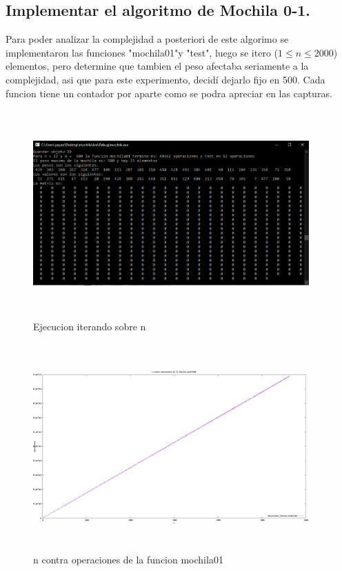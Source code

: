 \documentclass[spanish]{article}
\begin{document}
	\subsection{Implementar el algoritmo de Mochila 0-1.} 
	Para poder analizar la complejidad a posteriori de este algorimo se implementaron las funciones "mochila01"y "test", luego se itero ($1\leq n\leq 2000$) elementos, pero determine que tambien el peso afectaba seriamente a la complejidad, asi que para este experimento, decidí dejarlo fijo en 500. Cada funcion tiene un contador por aparte como se podra apreciar en las capturas.
	\begin{figure}[H]
		\centering
		\includegraphics[width=400px,height=300px]{captura2}
		\caption{Ejecucion iterando sobre n}
	\end{figure}
	\begin{figure}[H]
		\centering
		\includegraphics[width=400px,height=300px]{grafica4}
		\caption{n contra operaciones de la funcion mochila01}
	\end{figure}
\end{document}
